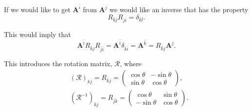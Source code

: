 \documentclass[10pt]{article}
\begin{document}
	If we would like to get $\mathbf{A}^{\bar{i}}$ from $\mathbf{A}^{j}$ we would like an inverse that has the property
	\begin{equation}
	  R_{\bar{k}j}R_{j \bar{i}} = \delta_{\bar{k}\bar{l}}.
	\end{equation}

	This would imply that
	\begin{equation}
	  \mathbf{A}^{\bar{i}} R_{\bar{k}j} R_{j \hat{i}} = \mathbf{A}^{\bar{i}}\delta_{\bar{k}\bar{i}} = \mathbf{A}^{\bar{k}} = R_{\bar{k}j}\mathbf{A}^{j}.
	\end{equation}

	This introduces the rotation matrix, $\mathcal{R}$, where
	\begin{equation}
	  \begin{aligned}
	  &(\mathcal{R})_{kj} = R_{\bar{k}j} = \begin{pmatrix} 
		  \cos \theta & -\sin \theta \\ \sin \theta & \cos \theta 
	  \end{pmatrix}, \\
	  &(\mathcal{R}^{-1})_{kj} = R_{\bar{jk}} = \begin{pmatrix} 
		  \cos \theta & \sin \theta \\ -\sin \theta & \cos \theta 
	  \end{pmatrix}.
	  \end{aligned}
	\end{equation}
\end{document}
